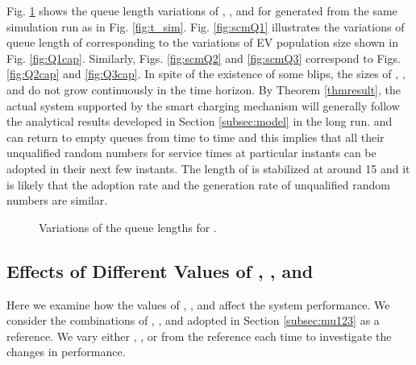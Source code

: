 \documentclass[journal]{IEEEtran}
\begin{document}
Fig. \ref{fig:scm_queue} shows the queue length variations of , , and  for  generated from the same simulation run as in Fig. \ref{fig:t_sim}. Fig. \ref{fig:scmQ1} illustrates the variations of queue length of  corresponding to the variations of EV population size shown in Fig. \ref{fig:Q1cap}. Similarly, Figs. \ref{fig:scmQ2} and \ref{fig:scmQ3} correspond to Figs. \ref{fig:Q2cap} and \ref{fig:Q3cap}. In spite of the existence of some blips, the sizes of , , and  do not grow continuously in the time horizon. 
By Theorem \ref{thmresult}, the actual system supported by the smart charging mechanism will generally follow the analytical results developed in Section \ref{subsec:model} in the long run.
 and  can return to empty queues from time to time and this implies that all their unqualified random numbers for service times at particular instants can be adopted in their next few instants. The length of  is stabilized at around 15 and it is likely that the adoption rate and the generation rate of unqualified random numbers are similar.

\begin{figure}[!t]
	\begin{center}
	\end{center}
	\caption{Variations of the queue lengths for .}
  \label{fig:scm_queue}
\end{figure}

\subsection{Effects of Different Values of , , and }
Here we examine how the values of , , and  affect the system performance. We consider  the combinations of , , and  adopted in Section \ref{subsec:mu123} as a reference. We vary either , , or  from the reference each time to investigate the changes in performance.
\end{document}
